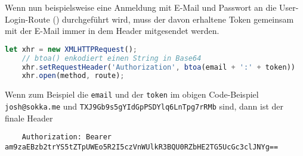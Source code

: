 Wenn nun beispielsweise eine Anmeldung mit E-Mail und Passwort an die User-Login-Route () durchgeführt wird, muss der davon erhaltene Token gemeinsam mit der E-Mail immer in dem Header mitgesendet werden.

\begin{lstlisting}[language=JavaScript]
    let xhr = new XMLHTTPRequest();
    // btoa() enkodiert einen String in Base64
    xhr.setRequestHeader('Authorization', btoa(email + ':' + token))
    xhr.open(method, route);
\end{lstlisting}

Wenn zum Beispiel die \lstinline{email} und der \lstinline{token} im obigen Code-Beispiel \lstinline{josh@sokka.me} und \lstinline{TXJ9Gb9s5gYIdGpPSDYlq6LnTpg7rRMb} sind, dann ist der finale Header

\begin{lstlisting}
    Authorization: Bearer am9zaEBzb2trYS5tZTpUWEo5R2I5czVnWUlkR3BQU0RZbHE2TG5UcGc3clJNYg==
\end{lstlisting}












